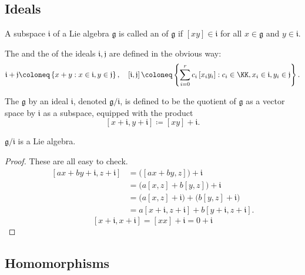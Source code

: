 \documentclass{article}
\newcommand{\lb}[1]{\ensuremath{\left[{#1}\right]}}
\newcommand{\frkg}{{\ensuremath{\mathfrak{g}}}}
\newcommand{\frki}{{\ensuremath{\mathfrak{i}}}}
\newcommand{\frkj}{{\ensuremath{\mathfrak{j}}}}
\begin{document}
\subsection{Ideals}

\begin{definition}
    A subspace $\frki$ of a Lie algebra $\frkg$ is called an  of $\frkg$ if $\lb{xy} \in \frki$ for all $x \in \frkg$ and $y \in \frki$.
\end{definition}

The  and the  of the ideals $\frki, \frkj$ are defined in the obvious way:
\[
    \frki + \frkj
    \coloneq
    \left\{
        x + y : x \in \frki, y \in \frkj
    \right\},\quad
    \lb{\frki,\frkj}
    \coloneq
    \left\{
        \sum_{i=0}^rc_i\lb{x_iy_i}
        :
        c_i \in \KK, x_i \in \frki, y_i \in \frkj
    \right\}.
\]

\begin{definition}
    The  $\frkg$ by an ideal $\frki$, denoted $\frkg/\frki$, is defined to be the quotient of $\frkg$ as a vector space by $\frki$ as a subspace, equipped with the product
    \[
        \lb{x+\frki,y+\frki}
        \coloneq
        \lb{xy} + \frki.
    \]
\end{definition}

\begin{proposition}
    $\frkg/\frki$ is a Lie algebra.
\end{proposition}
\begin{proof}
    These are all easy to check.
    \begin{align*}
        \lb{ax+by+\frki,z+\frki}
        &=
        \Big(\lb{ax+by,z}\Big) + \frki
        \\\
        &=
        \Big(
            a\lb{x,z}  
            +
            b\lb{y,z}  
        \Big)
        + \frki
        \\
        &=
        \Big(
            a\lb{x,z} + \frki
        \Big)
        +
        \Big(
            b\lb{y,z} + \frki 
        \Big)
        \\
        &=
        a\lb{x+\frki,z+\frki} + b\lb{y+\frki,z+\frki}.
    \end{align*}
    \[
        \lb{x+\frki,x+\frki}
        =
        \lb{xx} + \frki
        =
        0 + \frki
    \]
\end{proof}

\newcommand{\barphi}{\ensuremath{\overline{\phi}}}

\subsection{Homomorphisms}
\end{document}
